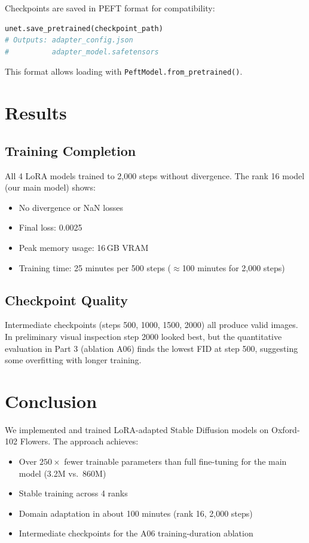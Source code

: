 \documentclass[11pt]{article}
\begin{document}
Checkpoints are saved in PEFT format for compatibility:
\begin{lstlisting}[language=Python]
unet.save_pretrained(checkpoint_path)
# Outputs: adapter_config.json
#          adapter_model.safetensors
\end{lstlisting}

This format allows loading with \texttt{PeftModel.from\_pretrained()}.

\section{Results}

\subsection{Training Completion}

All 4 LoRA models trained to 2,000 steps without divergence. The rank 16 model (our main model) shows:

\begin{itemize}
    \item No divergence or NaN losses
    \item Final loss: 0.0025
    \item Peak memory usage: 16\,GB VRAM
    \item Training time: 25 minutes per 500 steps ($\approx$100 minutes for 2,000 steps)
\end{itemize}

\subsection{Checkpoint Quality}

Intermediate checkpoints (steps 500, 1000, 1500, 2000) all produce valid images. In preliminary visual inspection step 2000 looked best, but the quantitative evaluation in Part 3 (ablation A06) finds the lowest FID at step 500, suggesting some overfitting with longer training.

\section{Conclusion}

We implemented and trained LoRA-adapted Stable Diffusion models on Oxford-102 Flowers. The approach achieves:
\begin{itemize}
    \item Over $250\times$ fewer trainable parameters than full fine-tuning for the main model (3.2M vs.\ 860M)
    \item Stable training across 4 ranks
    \item Domain adaptation in about 100 minutes (rank 16, 2,000 steps)
    \item Intermediate checkpoints for the A06 training-duration ablation
\end{itemize}
\end{document}
